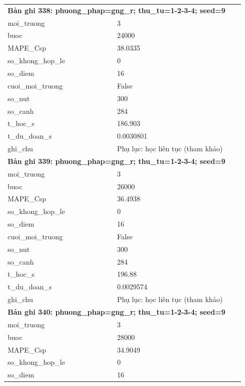 \begin{longtable}{p{0.43\linewidth}p{0.50\linewidth}}
\midrule
\multicolumn{2}{p{0.95\linewidth}}{\textbf{Bản ghi 338: phuong\_phap=gng\_r; thu\_tu=1-2-3-4; seed=9}} \\
moi\_\allowbreak truong & 3 \\
buoc & 24000 \\
MAPE\_\allowbreak Csp & 38.0335 \\
so\_\allowbreak khong\_\allowbreak hop\_\allowbreak le & 0 \\
so\_\allowbreak diem & 16 \\
cuoi\_\allowbreak moi\_\allowbreak truong & False \\
so\_\allowbreak nut & 300 \\
so\_\allowbreak canh & 284 \\
t\_\allowbreak hoc\_\allowbreak s & 186.903 \\
t\_\allowbreak du\_\allowbreak doan\_\allowbreak s & 0.0030801 \\
ghi\_\allowbreak chu & Phụ lục: học liên tục (tham khảo) \\
\midrule
\multicolumn{2}{p{0.95\linewidth}}{\textbf{Bản ghi 339: phuong\_phap=gng\_r; thu\_tu=1-2-3-4; seed=9}} \\
moi\_\allowbreak truong & 3 \\
buoc & 26000 \\
MAPE\_\allowbreak Csp & 36.4938 \\
so\_\allowbreak khong\_\allowbreak hop\_\allowbreak le & 0 \\
so\_\allowbreak diem & 16 \\
cuoi\_\allowbreak moi\_\allowbreak truong & False \\
so\_\allowbreak nut & 300 \\
so\_\allowbreak canh & 284 \\
t\_\allowbreak hoc\_\allowbreak s & 196.88 \\
t\_\allowbreak du\_\allowbreak doan\_\allowbreak s & 0.0029574 \\
ghi\_\allowbreak chu & Phụ lục: học liên tục (tham khảo) \\
\midrule
\multicolumn{2}{p{0.95\linewidth}}{\textbf{Bản ghi 340: phuong\_phap=gng\_r; thu\_tu=1-2-3-4; seed=9}} \\
moi\_\allowbreak truong & 3 \\
buoc & 28000 \\
MAPE\_\allowbreak Csp & 34.9049 \\
so\_\allowbreak khong\_\allowbreak hop\_\allowbreak le & 0 \\
so\_\allowbreak diem & 16 \\

\end{longtable}
